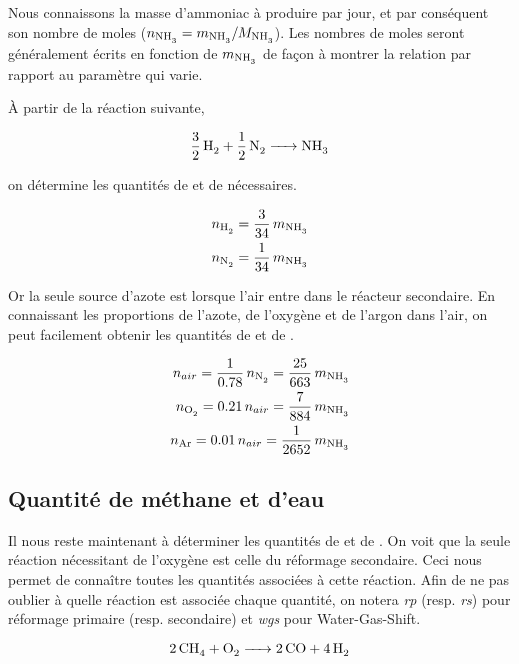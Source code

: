 \documentclass[a4paper, oneside, 12pt]{article}
\begin{document}
Nous connaissons la masse d'ammoniac à produire par jour, 
et par conséquent son nombre de moles ($n_{\ce{NH3}} = m_{\ce{NH3}}/M_{\ce{NH3}}$).
Les nombres de moles seront généralement écrits en fonction de $m_{\ce{NH3}}$ 
de façon à montrer la relation par rapport au paramètre qui varie.

À partir de la réaction suivante,

\begin{equation}
	\ce{\frac{3}{2} \, H2 + \frac{1}{2} \, N2 -> NH3} 
	\label{eq:ammoniac}
\end{equation}

on détermine les quantités de  et de  nécessaires.

\begin{align}
	n_{\ce{H2}} = \frac{3}{34} \, m_{\ce{NH3}} \\
	n_{\ce{N2}} = \frac{1}{34} \, m_{\ce{NH3}}
\end{align}

Or la seule source d'azote est lorsque l'air entre dans le réacteur secondaire.
En connaissant les proportions de l'azote, de l'oxygène et de l'argon dans 
l'air, on peut facilement obtenir les quantités de  et de .

\begin{align}
	n_{air} = \frac{1}{0.78} \, n_{\ce{N2}} = \frac{25}{663} \, m_{\ce{NH3}} \\
	n_{\ce{O2}} = 0.21 \, n_{air} = \frac{7}{884} \, m_{\ce{NH3}} \\
	n_{\ce{Ar}} = 0.01 \, n_{air} = \frac{1}{2652} \, m_{\ce{NH3}}
\end{align}

\subsection{Quantité de méthane et d'eau}

Il nous reste maintenant à déterminer les quantités de  et de .
On voit que la seule réaction nécessitant de l'oxygène est celle du 
réformage secondaire. Ceci nous permet de conna\^itre toutes les quantités 
associées à cette réaction. 
Afin de ne pas oublier à quelle réaction est associée chaque quantité, 
on notera \textit{rp} (resp. \textit{rs}) pour réformage primaire (resp. secondaire)
et \textit{wgs} pour Water-Gas-Shift.

\begin{equation}
	\ce{2CH4 + O2 -> 2CO + 4H2}
	\label{eq:ref_sec}
\end{equation}
\end{document}
